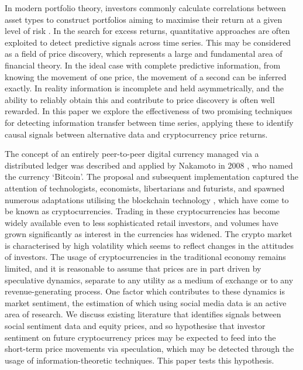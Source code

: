 \documentclass[]{rsos}%
\begin{document}
  In modern portfolio theory, investors commonly calculate correlations between asset types to construct portfolios aiming to maximise their return at a given level of risk \cite{markowitz1952portfolio}. In the search for excess returns, quantitative approaches are often exploited to detect predictive signals across time series. {\color{blue} This may be considered as a field of price discovery, which represents a large and fundamental area of financial theory.} In the ideal case {with complete predictive information, \color{blue}from} knowing the movement of one price, the movement of a second can be inferred {\color{blue} exactly. In reality information is incomplete and held asymmetrically, and the ability to reliably obtain this and contribute to price discovery is often well rewarded}. In this paper we explore the effectiveness of two promising techniques for detecting information transfer between time series, applying these to identify causal signals between alternative data and cryptocurrency {\color{blue} price returns}. 

  The concept of an entirely peer-to-peer digital currency managed via a distributed ledger was described and applied by Nakamoto in 2008 \cite{nakamoto2008bitcoin}, who named the currency `Bitcoin'. The proposal and subsequent implementation captured the attention of technologists, economists, libertarians and futurists, and spawned numerous adaptations utilising the blockchain technology \cite{aste2017blockchain}, which have come to be known as cryptocurrencies. Trading in these cryptocurrencies has become widely available even to less sophisticated retail investors, and volumes have grown significantly as interest in the currencies has widened. The crypto market is characterised by high volatility which seems to reflect changes in the attitudes of investors. The usage of cryptocurrencies in the traditional economy remains limited, and it is reasonable to assume that prices are in part driven by speculative dynamics, separate to any utility as a medium of exchange or to any revenue-generating process. %
  {\color{blue} One factor which contributes to these dynamics is market sentiment, the estimation of which using social media data is an active area of research}.  We discuss existing literature that identifies signals between social sentiment {\color{blue} data} and equity prices, and so hypothesise that investor sentiment on future cryptocurrency prices may be expected to feed into the short-term price movements via speculation, which may be detected {\color{blue} through the usage of} information-theoretic techniques. This paper tests this hypothesis. 
\end{document}
